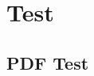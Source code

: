 \documentclass[a4paper,10pt]{report}
\begin{document}
\chapter{Test}
\section{PDF Test}

\end{document}
